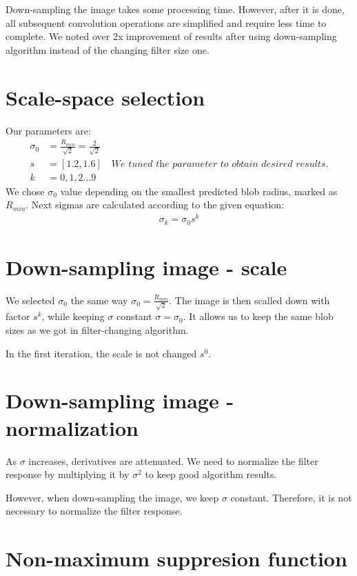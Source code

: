\documentclass{article}
\begin{document}
Down-sampling the image takes some processing time. However, after it is done, all subsequent convolution operations are simplified and require less time to complete. We noted over 2x improvement of results after using down-sampling algorithm instead of the changing filter size one. 

\section{Scale-space selection}
Our parameters are:
\begin{align*}
\sigma_0&=\frac{R_{min}}{\sqrt{2}}=\frac{2}{\sqrt{2}}\\
s&=[1.2,  1.6] \quad  \textit{We tuned the parameter to obtain desired results.}\\
k&=0,1,2...9
\end{align*}
We chose $\sigma_0$ value depending on the smallest predicted blob radius, marked as $R_{min}$. Next sigmas are calculated according to the given equation:
\begin{align*}
\sigma_k = \sigma_0s^k 
\end{align*}


\section{Down-sampling image - scale}
We selected $\sigma_0$ the same way $\sigma_0=\frac{R_{min}}{\sqrt{2}}$.
The image is then scalled down with factor $s^k$, while keeping $\sigma$ constant $\sigma=\sigma_0$. It allows us to keep the same blob sizes as we got in filter-changing algorithm.

In the first iteration, the scale is not changed $s^0$.

\section{Down-sampling image - normalization}
As $\sigma$ increases, derivatives are attenuated. We need to normalize the filter response by multiplying it by $\sigma^2$ to keep good algorithm results.

However, when down-sampling the image, we keep $\sigma$ constant. Therefore, it is not necessary to normalize the filter response.



\section{Non-maximum suppresion function}
\end{document}
